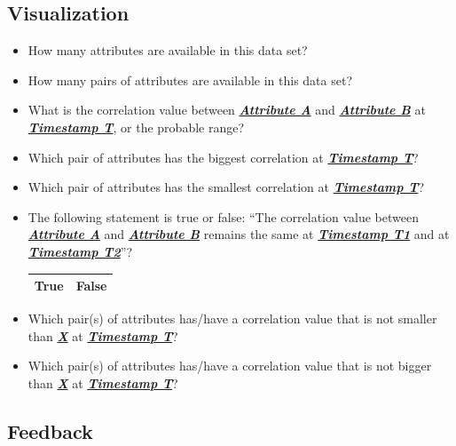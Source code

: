 \subsection{Visualization}
\label{sec:Evaluation:Questionnaire:V}
\begin{itemize}
\item How many attributes are available in this data set?
\item How many pairs of attributes are available in this data set?
\item What is the correlation value between \textit{\textbf{\underline{Attribute A}}} and \textit{\textbf{\underline{Attribute B}}} at \textit{\textbf{\underline{Timestamp T}}}, or the probable range?
\item Which pair of attributes has the biggest correlation at \underline{\textbf{\textit{Timestamp T}}}?
\item Which pair of attributes has the smallest correlation at \underline{\textbf{\textit{Timestamp T}}}?
\item The following statement is true or false: “The correlation value between \underline{\textit{\textbf{Attribute A}}} and \underline{\textit{\textbf{Attribute B}}} remains the same at \underline{\textit{\textbf{Timestamp T1}}} and at \underline{\textit{\textbf{Timestamp T2}}}”?\\
	\begin{tabular}{| l | c |}
	\hline
	True & False \\ \hline
\end{tabular}
\item Which pair(s) of attributes has/have a correlation value that is not smaller than \underline{\textit{\textbf{X}}} at \underline{\textit{\textbf{Timestamp T}}}?
\item Which pair(s) of attributes has/have a correlation value that is not bigger than \underline{\textit{\textbf{X}}} at \underline{\textit{\textbf{Timestamp T}}}?
\end{itemize}

\subsection{Feedback}
\label{sec:Evaluation:Questionnaire:F}
